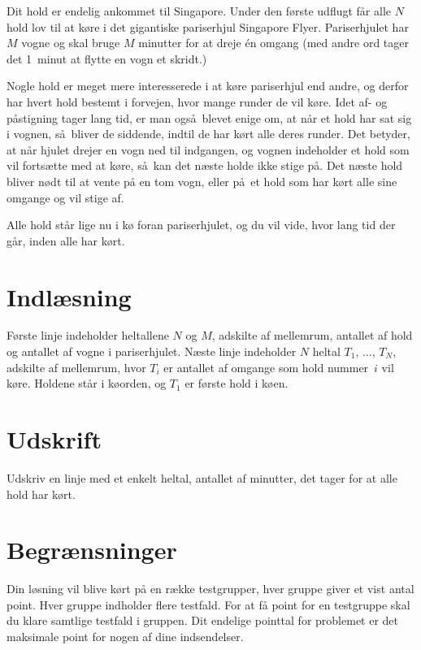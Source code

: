 

Dit hold er endelig ankommet til Singapore.
Under den første udflugt får alle $N$ hold lov til at køre i det gigantiske pariserhjul Singapore Flyer.
Pariserhjulet har $M$ vogne og skal bruge $M$ minutter for at dreje én omgang (med andre ord tager det 1~minut at flytte en vogn et skridt.)

Nogle hold er meget mere interesserede i at køre pariserhjul end andre, og derfor har hvert hold bestemt i forvejen, hvor mange runder de vil køre.
Idet af- og påstigning tager lang tid, er man også blevet enige om, at når et hold har sat sig i vognen, så bliver de siddende, indtil de har kørt alle deres runder.
Det betyder, at når hjulet drejer en vogn ned til indgangen, og vognen indeholder et hold som vil fortsætte med at køre, så kan det næste holde ikke stige på.
Det næste hold bliver nødt til at vente på en tom vogn, eller på et hold som har kørt alle sine omgange og vil stige af.

Alle hold står lige nu i kø foran pariserhjulet, og du vil vide, hvor lang tid der går, inden alle har kørt.

\section*{Indlæsning}

Første linje indeholder heltallene $N$ og $M$, adskilte af mellemrum, antallet af hold og antallet af vogne i pariserhjulet.
Næste linje indeholder $N$ heltal $T_1$, $\ldots$, $T_N$, adskilte af mellemrum, hvor $T_i$ er antallet af omgange som hold  nummer~$i$ vil køre.
Holdene står i køorden, og $T_1$ er første hold i køen.

\section*{Udskrift}
Udskriv en linje med et enkelt heltal, antallet af minutter, det tager for at alle hold har kørt.

\section*{Begrænsninger}
Din løsning vil blive kørt på en række testgrupper, hver gruppe giver et vist antal point.
Hver gruppe indholder flere testfald.
For at få point for en testgruppe skal du klare samtlige testfald i gruppen.
Dit endelige pointtal for problemet er det maksimale point for nogen af dine indsendelser.

